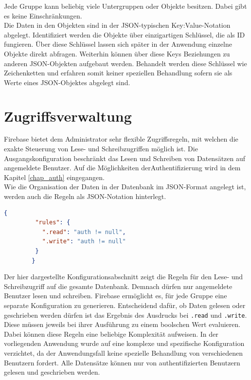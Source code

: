 Jede Gruppe kann beliebig viele Untergruppen oder Objekte besitzen. Dabei gibt es keine Einschränkungen.\\
Die Daten in den Objekten sind in der JSON-typischen Key:Value-Notation abgelegt.
Identifiziert werden die Objekte über einzigartigen Schlüssel, die als ID fungieren.
Über diese Schlüssel lassen sich später in der Anwendung einzelne Objekte direkt abfragen.
Weiterhin können über diese Keys Beziehungen zu anderen JSON-Objekten aufgebaut werden.
Behandelt werden diese Schlüssel wie Zeichenketten und erfahren somit keiner speziellen Behandlung sofern sie als Werte eines JSON-Objektes abgelegt sind.

\section{Zugriffsverwaltung}
Firebase bietet dem Administrator sehr flexible Zugriffsregeln, mit welchen die exakte Steuerung von Lese- und Schreibzugriffen möglich ist.
Die Ausgangskonfiguration beschränkt das Lesen und Schreiben von Datensätzen auf angemeldete Benutzer. Auf die Möglichkeiten derAuthentifizierung wird in dem Kapitel \ref{chap_auth} eingegangen.\\
Wie die Organisation der Daten in der Datenbank im JSON-Format angelegt ist, werden auch die Regeln als JSON-Notation hinterlegt.
       
\begin{lstlisting}[language=JSON, label=code_AccessRuleDatabase, caption=Beispiel-Konfiguration für Datenbankzugriffe]
		{
         "rules": {
           ".read": "auth != null",
           ".write": "auth != null"
         }
  		}
\end{lstlisting}

Der hier dargestellte Konfigurationsabschnitt zeigt die Regeln für den Lese- und Schreibzugriff auf die gesamte Datenbank. Demnach dürfen nur angemeldete Benutzer lesen und schreiben. Firebase ermöglicht es, für jede Gruppe eine separate Konfiguration zu generieren.
Entscheidend dafür, ob Daten gelesen oder geschrieben werden dürfen ist das Ergebnis des Ausdrucks bei \texttt{.read} und \texttt{.write}. Diese müssen jeweils bei ihrer Ausführung zu einem boolschen Wert evaluieren. Dabei können diese Regeln eine beliebige
Komplexität aufweisen.
In der vorliegenden Anwendung wurde auf eine komplexe und spezifische Konfiguration verzichtet, da der Anwendungsfall keine spezielle Behandlung von verschiedenen Benutzern fordert.
Alle Datensätze können nur von authentifizierten Benutzern gelesen und geschrieben werden.

